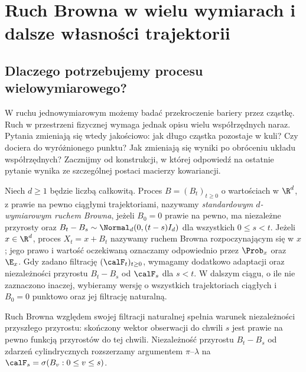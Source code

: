 \chapter{Ruch Browna w wielu wymiarach i dalsze własności trajektorii}
\label{ch:brown-multi}

\section{Dlaczego potrzebujemy procesu wielowymiarowego?}
W ruchu jednowymiarowym możemy badać przekroczenie bariery przez
cząstkę. Ruch w przestrzeni fizycznej wymaga jednak opisu wielu
współrzędnych naraz. Pytania zmieniają się wtedy jakościowo:
jak długo cząstka pozostaje w kuli? Czy dociera do wyróżnionego
punktu? Jak zmieniają się wyniki po obróceniu układu współrzędnych?
Zacznijmy od konstrukcji, w której odpowiedź na ostatnie pytanie
wynika ze szczególnej postaci macierzy kowariancji.

\begin{definicja}
Niech $d\ge1$ będzie liczbą całkowitą. Proces $B=(B_t)_{t\ge0}$ o wartościach
w $\R^d$, z prawie na pewno ciągłymi trajektoriami, nazywamy
\emph{standardowym $d$-wymiarowym ruchem Browna}, jeżeli
$B_0=0$ prawie na pewno, ma niezależne przyrosty oraz
$B_t-B_s\sim\Normal_d(0,(t-s)I_d)$ dla wszystkich $0\le s<t$.
Jeżeli $x\in\R^d$, proces $X_t=x+B_t$ nazywamy ruchem Browna
rozpoczynającym się w $x$; jego prawo i wartość oczekiwaną oznaczamy
odpowiednio przez $\Prob_x$ oraz $\E_x$.
Gdy zadano filtrację $(\calF_t)_{t\ge0}$, wymagamy
dodatkowo adaptacji oraz niezależności przyrostu
$B_t-B_s$ od $\calF_s$ dla $s<t$.
W dalszym ciągu, o ile nie zaznaczono inaczej, wybieramy
wersję o wszystkich trajektoriach ciągłych i $B_0=0$
punktowo oraz jej filtrację naturalną.
\end{definicja}

Ruch Browna względem swojej filtracji naturalnej
spełnia warunek niezależności przyszłego przyrostu:
skończony wektor obserwacji do chwili $s$ jest
prawie na pewno funkcją przyrostów do tej chwili.
Niezależność przyrostu $B_t-B_s$ od zdarzeń
cylindrycznych rozszerzamy argumentem $\pi$--$\lambda$
na $\calF_s=\sigma(B_v:0\le v\le s)$.

